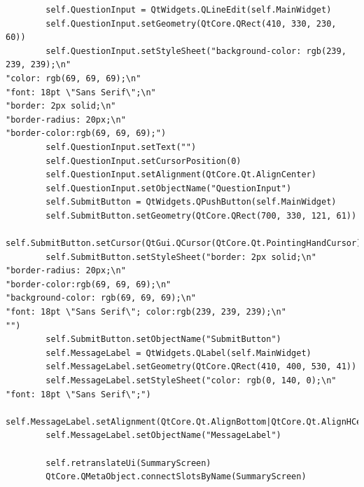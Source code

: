\documentclass{article}
\begin{document}
\begin{lstlisting}
        self.QuestionInput = QtWidgets.QLineEdit(self.MainWidget)
        self.QuestionInput.setGeometry(QtCore.QRect(410, 330, 230, 60))
        self.QuestionInput.setStyleSheet("background-color: rgb(239, 239, 239);\n"
"color: rgb(69, 69, 69);\n"
"font: 18pt \"Sans Serif\";\n"
"border: 2px solid;\n"
"border-radius: 20px;\n"
"border-color:rgb(69, 69, 69);")
        self.QuestionInput.setText("")
        self.QuestionInput.setCursorPosition(0)
        self.QuestionInput.setAlignment(QtCore.Qt.AlignCenter)
        self.QuestionInput.setObjectName("QuestionInput")
        self.SubmitButton = QtWidgets.QPushButton(self.MainWidget)
        self.SubmitButton.setGeometry(QtCore.QRect(700, 330, 121, 61))
        self.SubmitButton.setCursor(QtGui.QCursor(QtCore.Qt.PointingHandCursor))
        self.SubmitButton.setStyleSheet("border: 2px solid;\n"
"border-radius: 20px;\n"
"border-color:rgb(69, 69, 69);\n"
"background-color: rgb(69, 69, 69);\n"
"font: 18pt \"Sans Serif\"; color:rgb(239, 239, 239);\n"
"")
        self.SubmitButton.setObjectName("SubmitButton")
        self.MessageLabel = QtWidgets.QLabel(self.MainWidget)
        self.MessageLabel.setGeometry(QtCore.QRect(410, 400, 530, 41))
        self.MessageLabel.setStyleSheet("color: rgb(0, 140, 0);\n"
"font: 18pt \"Sans Serif\";")
        self.MessageLabel.setAlignment(QtCore.Qt.AlignBottom|QtCore.Qt.AlignHCenter)
        self.MessageLabel.setObjectName("MessageLabel")

        self.retranslateUi(SummaryScreen)
        QtCore.QMetaObject.connectSlotsByName(SummaryScreen)


\end{lstlisting}
\end{document}

